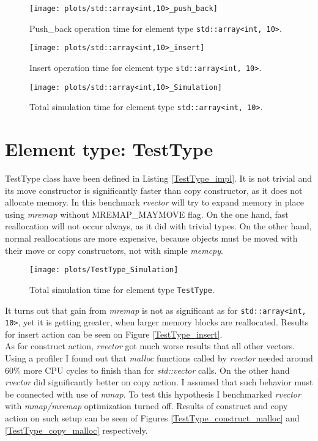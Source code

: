 \documentclass[inz, english, shortabstract]{iithesis}
\begin{document}
\begin{figure}[h!]
\texttt{[image: plots/std::array<int,10>\_push\_back]}
\caption{Push\_back operation time for element type \lstinline{std::array<int, 10>}.}
\label{array_push_back}
\end{figure}

\begin{figure}[h!]
\texttt{[image: plots/std::array<int,10>\_insert]}
\caption{Insert operation time for element type \lstinline{std::array<int, 10>}.}
\label{array_insert}
\end{figure}

\begin{figure}[h!]
\texttt{[image: plots/std::array<int,10>\_Simulation]}
\caption{Total simulation time for element type \lstinline{std::array<int, 10>}.}
\label{array_simulation}
\end{figure}

\clearpage
\section{Element type: TestType}
TestType class have been defined in Listing \ref{TestType_impl}. It is not trivial and its move constructor is significantly faster than copy constructor, as it does not allocate memory. In this benchmark  {\it rvector} will try to expand memory in place using {\it mremap} without MREMAP\_MAYMOVE flag. On the one hand, fast reallocation will not occur always, as it did with trivial types. On the other hand, normal reallocations are more expensive, because objects must be moved with their move or copy constructors, not with simple {\it memcpy}.

\begin{figure}[h!]
\texttt{[image: plots/TestType\_Simulation]}
\caption{Total simulation time for element type \lstinline{TestType}.}
\label{TestType_push_back}
\end{figure}

It turns out that gain from {\it mremap} is not as significant as for \lstinline{std::array<int, 10>}, yet it is getting greater, when larger memory blocks are reallocated. Results for insert action can be seen on Figure \ref{TestType_insert}. 
\\


As for construct action, {\it rvector} got much worse results that all other vectors. Using a profiler I found out that {\it malloc} functions called by {\it rvector} needed around 60\% more CPU cycles to finish than for {\it std::vector} calls. On the other hand {\it rvector} did significantly better on copy action. I assumed that such behavior must be connected with use of {\it mmap}. To test this hypothesis I benchmarked {\it rvector} with {\it mmap/mremap} optimization turned off. Results of construct and copy action on such setup can be seen of Figures \ref{TestType_construct_malloc} and \ref{TestType_copy_malloc} respectively.
\end{document}
